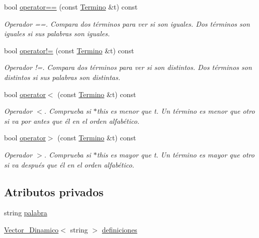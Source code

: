 \begin{DoxyCompactItemize}
bool \mbox{\hyperlink{classTermino_adf075fbce1b208a5214e9364e5f2520a}{operator==}} (const \mbox{\hyperlink{classTermino}{Termino}} \&t) const
\begin{DoxyCompactList}\small\item\em Operador ==. Compara dos términos para ver si son iguales. Dos términos son iguales si sus palabras son iguales. \end{DoxyCompactList}\item 
bool \mbox{\hyperlink{classTermino_a18fcc1cd64321afc8e17bb7ddaa9172a}{operator!=}} (const \mbox{\hyperlink{classTermino}{Termino}} \&t) const
\begin{DoxyCompactList}\small\item\em Operador !=. Compara dos términos para ver si son distintos. Dos términos son distintos si sus palabras son distintas. \end{DoxyCompactList}\item 
bool \mbox{\hyperlink{classTermino_a2674fda8a9f8f9e40ba338953e3e94ae}{operator$<$}} (const \mbox{\hyperlink{classTermino}{Termino}} \&t) const
\begin{DoxyCompactList}\small\item\em Operador $<$. Comprueba si $\ast$this es menor que t. Un término es menor que otro si va por antes que él en el orden alfabético. \end{DoxyCompactList}\item 
bool \mbox{\hyperlink{classTermino_a72be5a52ffa4dbf55ecd6dfb6af12476}{operator$>$}} (const \mbox{\hyperlink{classTermino}{Termino}} \&t) const
\begin{DoxyCompactList}\small\item\em Operador $>$. Comprueba si $\ast$this es mayor que t. Un término es mayor que otro si va después que él en el orden alfabético. \end{DoxyCompactList}\end{DoxyCompactItemize}
\subsection*{Atributos privados}
\begin{DoxyCompactItemize}
\item 
string \mbox{\hyperlink{classTermino_aa55f0db9f49be5bf785a7bf53aedd684}{palabra}}
\item 
\mbox{\hyperlink{classVector__Dinamico}{Vector\+\_\+\+Dinamico}}$<$ string $>$ \mbox{\hyperlink{classTermino_a31558652d55dd5133f846101e6609862}{definiciones}}
\end{DoxyCompactItemize}
